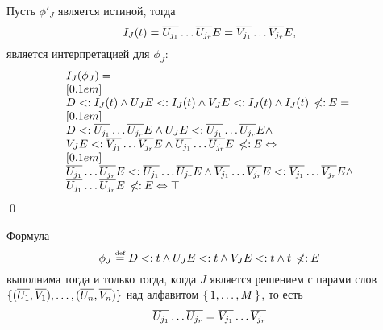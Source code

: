 \begin{proof*}
Пусть $\phi'_{J}$ является истиной, тогда
\[I_{J}(t) = \overline{{U}_{j_1}} \ldots \overline{{U}_{j_r}}{E} = \overline{{V}_{j_1}} \ldots \overline{{V}_{j_r}}{E},\] является интерпретацией для $\phi_{J}$:
\[
    \begin{array}{l}
    I_{J}(\phi_{J}) = \\
    [0.1em] \\
    D <: I_{J}(t) \land {U}_{J}{E} <: I_{J}(t) \land {V}_{J}{E} <: I_{J}(t) \land I_{J}(t) \:\not\!\!{<:}\: {E} = \\
    [0.1em] \\
    D <: \overline{{U}_{j_1}} \ldots \overline{{U}_{j_r}}{E} \land {U}_{J}{E} <: \overline{{U}_{j_1}} \ldots \overline{{U}_{j_r}}{E} \land \\
    {V}_{J}{E} <: \overline{{V}_{j_1}} \ldots \overline{{V}_{j_r}}{E} \land \overline{{U}_{j_1}} \ldots \overline{{U}_{j_r}}{E} \:\not\!\!{<:}\: {E} \Leftrightarrow \\
    [0.1em] \\
    \overline{{U}_{j_1}} \ldots \overline{{U}_{j_r}}{E} <: \overline{{U}_{j_1}} \ldots \overline{{U}_{j_r}}{E} \land
    \overline{{V}_{j_1}} \ldots \overline{{V}_{j_r}}{E} <: \overline{{V}_{j_1}} \ldots \overline{{V}_{j_r}}{E} \land \\
    \overline{{U}_{j_1}} \ldots \overline{{U}_{j_r}}{E} \:\not\!\!{<:}\: {E} \Leftrightarrow \top
    \end{array}
\]
\qed\end{proof*}
\begin{thm}{\label{thm:pcpphi3}}
   Формула
\[
      \phi_{J} \mathrel{\stackrel{\mbox{\normalfont\tiny def}}{=}} D <: t \land {U}_{J}{E} <: t \land {V}_{J}{E} <: t \land t \:\not\!\!{<:}\: {E}
\]
выполнима тогда и только тогда, когда $J$ является решением \pcp{} с парами слов $\lbrace (\overline{{U}_{1}}, \overline{{V}_{1}}), \ldots , (\overline{{U}_{n}}, \overline{{V}_{n}})\rbrace$ над алфавитом $\lbrace \, {1}{},\ldots,{M}{} \, \rbrace$, то есть
\[
    \overline{{U}_{j_1}} \ldots \overline{{U}_{j_r}} = \overline{{V}_{j_1}} \ldots \overline{{V}_{j_r}}
\]
\end{thm}
